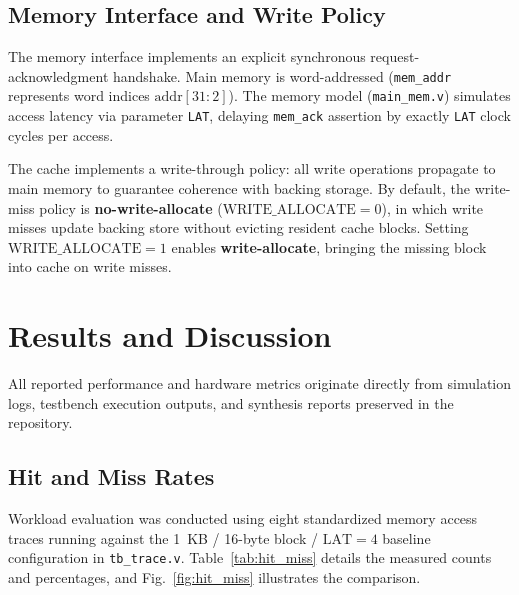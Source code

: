 \documentclass[conference]{IEEEtran}
\begin{document}
\subsection{Memory Interface and Write Policy}
The memory interface implements an explicit synchronous request-acknowledgment handshake. Main memory is word-addressed (\texttt{mem\_addr} represents word indices $\text{addr}[31:2]$). The memory model (\texttt{main\_mem.v}) simulates access latency via parameter \texttt{LAT}, delaying \texttt{mem\_ack} assertion by exactly \texttt{LAT} clock cycles per access.

The cache implements a write-through policy: all write operations propagate to main memory to guarantee coherence with backing storage. By default, the write-miss policy is \textbf{no-write-allocate} ($\text{WRITE\_ALLOCATE}=0$), in which write misses update backing store without evicting resident cache blocks. Setting $\text{WRITE\_ALLOCATE}=1$ enables \textbf{write-allocate}, bringing the missing block into cache on write misses.

\section{Results and Discussion}
All reported performance and hardware metrics originate directly from simulation logs, testbench execution outputs, and synthesis reports preserved in the repository.

\subsection{Hit and Miss Rates}
Workload evaluation was conducted using eight standardized memory access traces running against the 1~KB / 16-byte block / $\text{LAT}=4$ baseline configuration in \texttt{tb\_trace.v}. Table~\ref{tab:hit_miss} details the measured counts and percentages, and Fig.~\ref{fig:hit_miss} illustrates the comparison.
\end{document}
